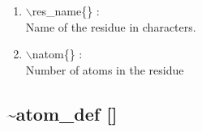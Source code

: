 \documentclass[12pt,titlepage]{article}
\begin{document}
\begin{enumerate}

 \vspace{0.15in} 
 \item  $\backslash$res\_name\{\} : \\ 
   Name of the residue in characters.

 \vspace{0.15in} 
 \item  $\backslash$natom\{\} : \\ 
   Number of atoms in the residue
\end{enumerate}

\newpage
\subsection*{\bf \~{ }atom\_def []} 
\end{document}
